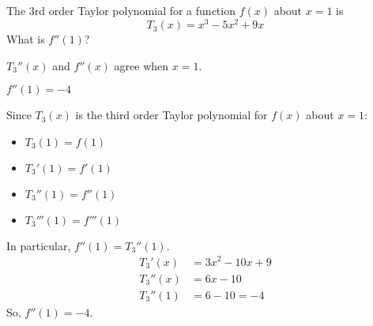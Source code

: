 %
%



\subsection*{\Conceptual}


\begin{question}\label{s3.4.4conc1}
The 3rd order Taylor polynomial for a function $f(x)$ about $x=1$ is
\[T_3(x)=x^3-5x^2+9x\] What  is $f''(1)$?
\end{question}
\begin{hint}
$T_3''(x)$ and $f''(x)$ agree when $x=1$.
\end{hint}
\begin{answer}
$f''(1)=-4$
\end{answer}
\begin{solution}
Since $T_3(x)$ is the third order Taylor polynomial for $f(x)$ about $x=1$:
\begin{itemize}
\item $T_3(1)=f(1)$
\item $T_3'(1)=f'(1)$
\item $T_3''(1)=f''(1)$
\item $T_3'''(1)=f'''(1)$
\end{itemize}
In particular, $f''(1)=T_3''(1)$.
\begin{align*}
T_3'(x)&=3x^2-10x+9\\
T_3''(x)&=6x-10\\
T_3''(1)&=6-10=-4
\end{align*}
So, $f''(1)=-4$.
\end{solution}


